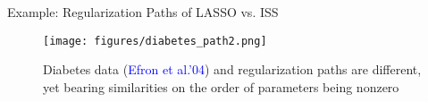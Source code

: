 \documentclass[slidestop,compress,9pt,epsfig,color]{beamer}
\providecommand{\Nm}{\mathcal{N}}
\theoremstyle{example}
\begin{document}
\begin{frame}{Example: Regularization Paths of LASSO vs. ISS}
\begin{figure}[!h]
\texttt{[image: figures/diabetes\_path2.png]}  \\
\caption{Diabetes data (\textcolor{blue}{Efron et al.'04}) and regularization paths are different, yet bearing similarities on the order of parameters being nonzero}
\end{figure}
\end{frame}


\end{document}
